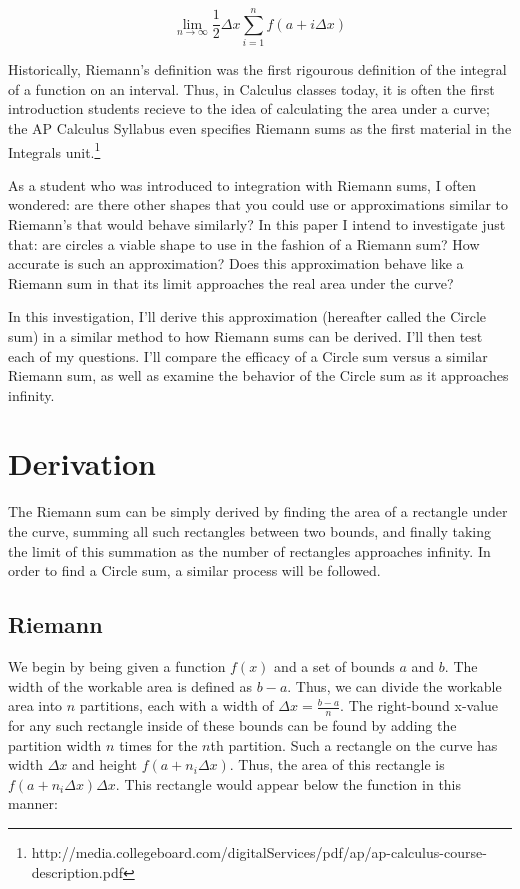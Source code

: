 \documentclass{article}
\begin{document}
    \[ \displaystyle\lim_{n \to \infty}\frac{1}{2}\Delta x\sum_{i=1}^n f(a+i\Delta x) \]

    Historically, Riemann's definition was the first rigourous definition of the
    integral of a function on an interval. Thus, in Calculus classes today, it is often
    the first introduction students recieve to the idea of calculating the area
    under a curve; the AP Calculus Syllabus even specifies Riemann sums as the
    first material in the Integrals unit.\footnote{http://media.collegeboard.com/digitalServices/pdf/ap/ap-calculus-course-description.pdf}

    As a student who was introduced to integration with Riemann sums, I often
    wondered: are there other shapes that you could use or approximations similar
    to Riemann's that would behave similarly? In this paper I intend to
    investigate just that: are circles a viable shape to use in the fashion of
    a Riemann sum? How accurate is such an approximation? Does this approximation
    behave like a Riemann sum in that its limit approaches the real area under
    the curve?

    In this investigation, I'll derive this approximation (hereafter called the
     Circle sum) in a similar method to how Riemann sums can be derived.
    I'll then test each of my questions. I'll compare the efficacy of a Circle
    sum versus a similar Riemann sum, as well as examine the behavior of the Circle
    sum as it approaches infinity.

  \section{Derivation}
    The Riemann sum can be simply derived by finding the area of a rectangle under
    the curve, summing all such rectangles between two bounds, and finally taking
    the limit of this summation as the number of rectangles approaches infinity.
    In order to find a Circle sum, a similar process will be followed.

    \subsection{Riemann}
    We begin by being given a function \( f(x) \) and a set of bounds \( a \) and
    \( b \). The width of the workable area is defined as \( b-a \). Thus, we can
    divide the workable area into \( n \) partitions, each with a width of \( \Delta x = \frac{b-a}{n} \).
    The right-bound x-value for any such rectangle inside of these bounds can be
    found by adding the partition width \( n \) times for the \(n\)th partition.
    Such a rectangle on the curve has width \( \Delta x \) and height
    \( f(a+n_i\Delta x) \). Thus, the area of this rectangle is \( f(a+n_i\Delta x)\Delta x \).
    This rectangle would appear below the function in this manner:
\end{document}
